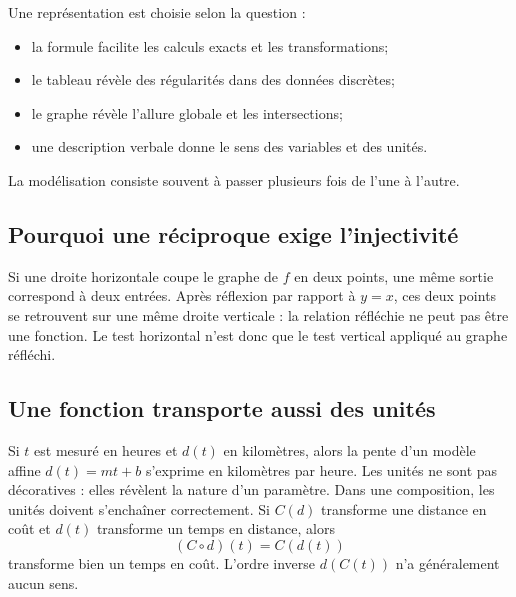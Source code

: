 \documentclass[12pt,a4paper,openany]{book}
\begin{document}
\begin{visualbox}
Une représentation est choisie selon la question :
\begin{itemize}
\item la formule facilite les calculs exacts et les transformations;
\item le tableau révèle des régularités dans des données discrètes;
\item le graphe révèle l'allure globale et les intersections;
\item une description verbale donne le sens des variables et des unités.
\end{itemize}
La modélisation consiste souvent à passer plusieurs fois de l'une à l'autre.
\end{visualbox}

\subsection{Pourquoi une réciproque exige l'injectivité}
Si une droite horizontale coupe le graphe de $f$ en deux points, une même sortie correspond à deux entrées. Après réflexion par rapport à $y=x$, ces deux points se retrouvent sur une même droite verticale : la relation réfléchie ne peut pas être une fonction. Le test horizontal n'est donc que le test vertical appliqué au graphe réfléchi.



\subsection{Une fonction transporte aussi des unités}
Si $t$ est mesuré en heures et $d(t)$ en kilomètres, alors la pente d'un modèle affine $d(t)=mt+b$ s'exprime en kilomètres par heure. Les unités ne sont pas décoratives : elles révèlent la nature d'un paramètre. Dans une composition, les unités doivent s'enchaîner correctement. Si $C(d)$ transforme une distance en coût et $d(t)$ transforme un temps en distance, alors
\[
(C\circ d)(t)=C(d(t))
\]
transforme bien un temps en coût. L'ordre inverse $d(C(t))$ n'a généralement aucun sens.

\begin{center}
\end{center}
\end{document}
